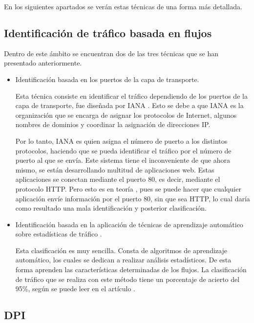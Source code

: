 \intro En los siguientes apartados se verán estas técnicas de una forma más detallada.

\subsection{Identificación de tráfico basada en flujos}

Dentro de este ámbito se encuentran dos de las tres técnicas que se han presentado anteriormente.
\begin{itemize}

\item Identificación basada en los puertos de la capa de transporte. \cite{iana}

\intro Esta técnica consiste en identificar el tráfico dependiendo de los puertos de la capa de transporte, 
fue diseñada por IANA \cite{ianaexplicacion}. Esto se debe a que IANA es la organización que se encarga de 
asignar los protocolos de Internet, algunos nombres de dominios y coordinar la asignación de direcciones IP. 

\intro Por lo tanto, IANA es quien asigna el número de puerto a los distintos protocolos, haciendo que se pueda 
identificar el tráfico por el número de puerto al que se envía. Este sistema tiene el inconveniente de que 
ahora mismo, se están desarrollando multitud de aplicaciones web. Estas aplicaciones se conectan mediante el 
puerto 80, es decir, mediante el protocolo HTTP. Pero esto es en teoría , pues se puede hacer que cualquier 
aplicación envíe información por el puerto 80, sin que sea HTTP, lo cual daría como resultado una mala 
identificación y posterior clasificación.

\item Identificación basada en la aplicación de técnicas de aprendizaje automático sobre estadísticas 
de tráfico \cite{learning}.

\intro Esta clasificación es muy sencilla. Consta de algoritmos de aprendizaje automático, los cuales se 
dedican a realizar análisis estadísticos. De esta forma aprenden las características determinadas de 
los flujos. La clasificación de tráfico que se realiza con este método tiene un porcentaje de acierto 
del 95\%, según se puede leer en el artículo \cite{comparacion}.
\end{itemize}

\subsection{DPI}

